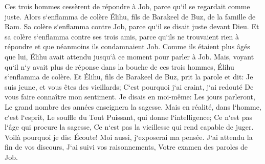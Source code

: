 \verse Ces trois hommes cessèrent de répondre à Job, parce qu`il se regardait comme juste. 
\verse Alors s`enflamma de colère Élihu, fils de Barakeel de Buz, de la famille de Ram. Sa colère s`enflamma contre Job, parce qu`il se disait juste devant Dieu. 
\verse Et sa colère s`enflamma contre ses trois amis, parce qu`ils ne trouvaient rien à répondre et que néanmoins ils condamnaient Job. 
\verse Comme ils étaient plus âgés que lui, Élihu avait attendu jusqu`à ce moment pour parler à Job. 
\verse Mais, voyant qu`il n`y avait plus de réponse dans la bouche de ces trois hommes, Élihu s`enflamma de colère. 
\verse Et Élihu, fils de Barakeel de Buz, prit la parole et dit: Je suis jeune, et vous êtes des vieillards; C`est pourquoi j`ai craint, j`ai redouté De vous faire connaître mon sentiment. 
\verse Je disais en moi-même: Les jours parleront, Le grand nombre des années enseignera la sagesse. 
\verse Mais en réalité, dans l`homme, c`est l`esprit, Le souffle du Tout Puissant, qui donne l`intelligence; 
\verse Ce n`est pas l`âge qui procure la sagesse, Ce n`est pas la vieillesse qui rend capable de juger. 
\verse Voilà pourquoi je dis: Écoute! Moi aussi, j`exposerai ma pensée. 
\verse J`ai attendu la fin de vos discours, J`ai suivi vos raisonnements, Votre examen des paroles de Job. 
